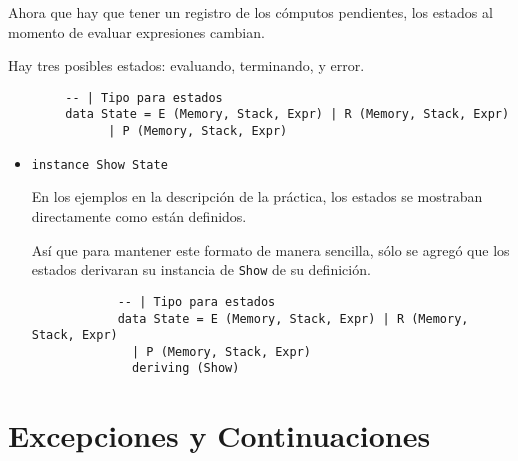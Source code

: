 \documentclass{article}
\newcommand{\tx}[1]{\texttt{#1}}
\begin{document}
    Ahora que hay que tener un registro de los cómputos pendientes, los estados
    al momento de evaluar expresiones cambian.

    Hay tres posibles estados: evaluando, terminando, y error.

    \begin{verbatim}
        -- | Tipo para estados
        data State = E (Memory, Stack, Expr) | R (Memory, Stack, Expr) 
              | P (Memory, Stack, Expr)
    \end{verbatim}

    \begin{itemize}
        \item \tx{instance Show State}

        En los ejemplos en la descripción de la práctica, los estados se
        mostraban directamente como están definidos.

        Así que para mantener este formato de manera sencilla, sólo se agregó 
        que los estados derivaran su instancia de \tx{Show} de su definición.

        \begin{verbatim}
            -- | Tipo para estados
            data State = E (Memory, Stack, Expr) | R (Memory, Stack, Expr) 
              | P (Memory, Stack, Expr)
              deriving (Show)
        \end{verbatim}
    \end{itemize}

    \section{Excepciones y Continuaciones}
\end{document}
